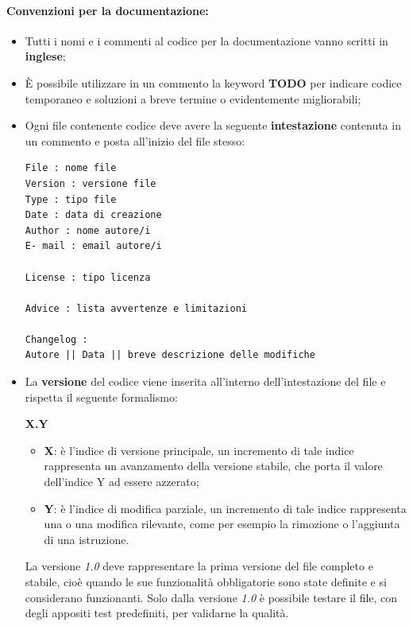 \documentclass[NormeDiProgetto.tex]{subfiles}
\begin{document}
\paragraph*{Convenzioni per la documentazione: }
\begin{itemize}
	\item Tutti i nomi e i commenti al codice per la documentazione vanno scritti in \textbf{inglese};
	\item \`{E} possibile utilizzare in un commento la keyword \textbf{TODO} per indicare codice temporaneo e soluzioni a breve termine o evidentemente migliorabili;
	\item Ogni file contenente codice deve avere la seguente \textbf{intestazione} contenuta in un commento e posta all'inizio del file stesso:
\begin{center}{
\begin{minipage}{12cm}
\begin{Verbatim}[frame=single]
File : nome file
Version : versione file
Type : tipo file
Date : data di creazione
Author : nome autore/i
E- mail : email autore/i

License : tipo licenza

Advice : lista avvertenze e limitazioni

Changelog :
Autore || Data || breve descrizione delle modifiche
\end{Verbatim}
\end{minipage}
}
\end{center}
	\item La \textbf{versione} del codice viene inserita all'interno dell'intestazione del file e rispetta il
	seguente formalismo:
	\begin{center}{\textbf{X.Y}}\end{center}	
	\begin{itemize}
		\item \textbf{X}: è l'indice di versione principale, un incremento di tale indice rappresenta un avanzamento della versione stabile, che porta il valore dell'indice Y ad essere azzerato;
		\item \textbf{Y}: è l'indice di modifica parziale, un incremento di tale indice rappresenta una  o una modifica rilevante, come per esempio la rimozione o l'aggiunta di una istruzione.
	\end{itemize}
	La versione \textit{1.0} deve rappresentare la prima versione del file completo e stabile, cioè quando le sue funzionalità obbligatorie sono state definite e si considerano funzionanti. Solo dalla versione \textit{1.0} è possibile testare il file, con degli appositi test predefiniti, per validarne la qualità.
\end{itemize}
\end{document}
